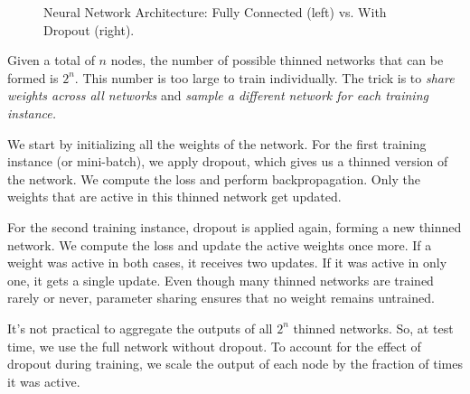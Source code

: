 \begin{figure}[h!]
    \caption{Neural Network Architecture: Fully Connected (left) vs. With Dropout (right).}
    \label{fig:nn_dropout_comparison}
\end{figure}

Given a total of \( n \) nodes, the number of possible thinned networks that can be formed is \( 2^n \). This number is too large to train individually. The trick is to \textit{share weights across all networks} and \textit{sample a different network for each training instance.}

We start by initializing all the weights of the network. For the first training instance (or mini-batch), we apply dropout, which gives us a thinned version of the network. We compute the loss and perform backpropagation. Only the weights that are active in this thinned network get updated.

For the second training instance, dropout is applied again, forming a new thinned network. We compute the loss and update the active weights once more. If a weight was active in both cases, it receives two updates. If it was active in only one, it gets a single update. Even though many thinned networks are trained rarely or never, parameter sharing ensures that no weight remains untrained.

It’s not practical to aggregate the outputs of all \( 2^n \) thinned networks. So, at test time, we use the full network without dropout. To account for the effect of dropout during training, we scale the output of each node by the fraction of times it was active.


